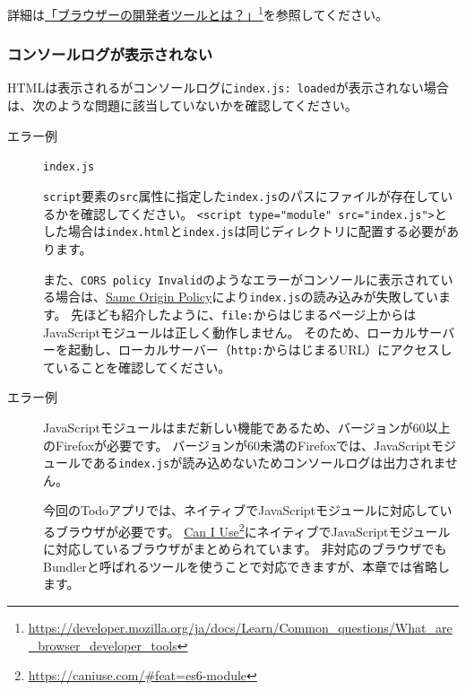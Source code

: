 詳細は\href{https://developer.mozilla.org/ja/docs/Learn/Common_questions/What_are_browser_developer_tools}{「ブラウザーの開発者ツールとは？」}\footnote{\url{https://developer.mozilla.org/ja/docs/Learn/Common_questions/What_are_browser_developer_tools}}を参照してください。

\hypertarget{error-not-display-console-log}{%
\subsubsection{コンソールログが表示されない}\label{error-not-display-console-log}}

HTMLは表示されるがコンソールログに\texttt{index.js: loaded}が表示されない場合は、次のような問題に該当していないかを確認してください。

\begin{description}
\item[エラー例] \texttt{index.js}

\texttt{script}要素の\texttt{src}属性に指定した\texttt{index.js}のパスにファイルが存在しているかを確認してください。
\texttt{<script type="module" src="index.js">}とした場合は\texttt{index.html}と\texttt{index.js}は同じディレクトリに配置する必要があります。

また、\texttt{CORS policy
Invalid}のようなエラーがコンソールに表示されている場合は、\href{https://developer.mozilla.org/ja/docs/Web/Security/Same-origin_policy}{Same
Origin
Policy}により\texttt{index.js}の読み込みが失敗しています。
先ほども紹介したように、\texttt{file:}からはじまるページ上からはJavaScriptモジュールは正しく動作しません。
そのため、ローカルサーバーを起動し、ローカルサーバー（\texttt{http:}からはじまるURL）にアクセスしていることを確認してください。

\item[エラー例] 

JavaScriptモジュールはまだ新しい機能であるため、バージョンが60以上のFirefoxが必要です。
バージョンが60未満のFirefoxでは、JavaScriptモジュールである\texttt{index.js}が読み込めないためコンソールログは出力されません。

今回のTodoアプリでは、ネイティブでJavaScriptモジュールに対応しているブラウザが必要です。
\href{https://caniuse.com/\#feat=es6-module}{Can I
Use}\footnote{\url{https://caniuse.com/\#feat=es6-module}}にネイティブでJavaScriptモジュールに対応しているブラウザがまとめられています。
非対応のブラウザでもBundlerと呼ばれるツールを使うことで対応できますが、本章では省略します。
\end{description}

